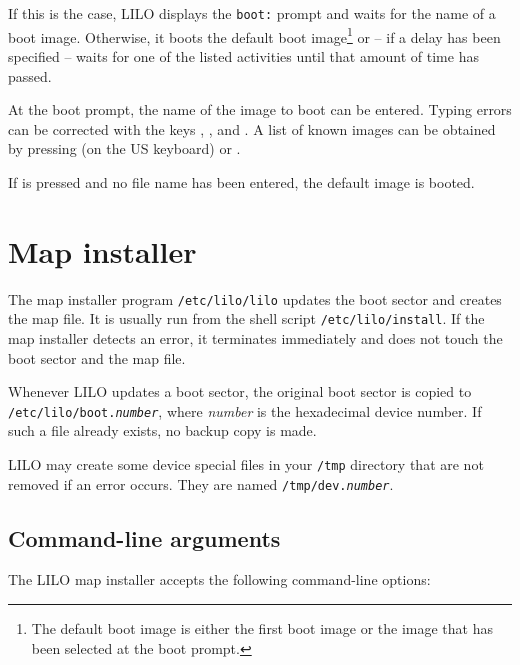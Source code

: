 If this is the case, LILO displays the \verb"boot:" prompt and waits for
the name of a boot image. Otherwise, it boots the default boot image\footnote{%
The default boot image is either the first boot image or the image that
has been selected at the boot prompt.}
or -- if a
delay has been specified -- waits for one of the listed activities
until that amount of time has passed.

At the boot prompt, the name of the image to boot can be entered. Typing
errors can be corrected with the keys , ,
 and . A list of known images can be obtained by
pressing  (on the US keyboard) or .

If  is pressed and no file name has been entered, the default
image is booted.


\section{Map installer}

The map installer program {\tt /etc/lilo/lilo} updates the boot sector
and creates the map file. It is usually run from the shell script
{\tt /etc/lilo/install}. If the map installer detects an error, it
terminates immediately and does not touch the boot sector and the map
file.

Whenever LILO updates a boot sector, the original boot sector is copied
to {\tt /etc/lilo/boot.{\it number\/}}, where {\it number\/} is the
hexadecimal device number. If such a file already exists, no backup
copy is made.

LILO may create some device special files in your {\tt /tmp} directory that
are not removed if an error occurs. They are named
{\tt /tmp/dev.{\it number}}.


\subsection{Command-line arguments}

The LILO map installer accepts the following command-line options:

